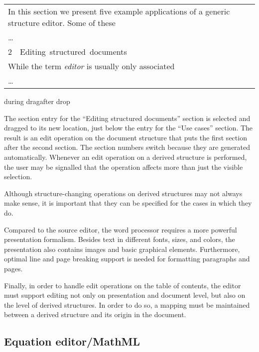 {\begin{tabular}[t]{p{5.2cm}}
\vspace{0.001cm}
In this section we present five example applications of a generic structure editor. Some of these\\
\dots\\
\vspace{0.005cm}
{\small 2~~Editing~structured~documents}\\
\vspace{0.001cm}
While the term {\em editor} is usually only associated\\ %
\dots 
\end{tabular}
}{during drag}{after drop}

The section entry for the ``Editing structured documents'' section is selected and dragged to its new location, just below the entry for the ``Use cases'' section. The result is an edit operation on the document structure that puts the first section after the second section. The section numbers switch because they are generated automatically. Whenever an edit operation on a derived structure is performed, the user may be signalled that the operation affects more than just the visible selection.

Although structure-changing operations on derived structures may not always make sense, it is important that they can be specified for the cases in which they do.
 

Compared to the source editor, the word processor requires a more powerful presentation formalism. Besides text in different fonts, sizes, and colors, the presentation also contains images and basic graphical elements. Furthermore, optimal line and page breaking support is needed for formatting paragraphs and pages. 

Finally, in order to handle edit operations on the table of contents, the editor must support editing not only on presentation and document level, but also on the level of derived structures. In order to do so, a mapping must be maintained between a derived structure and its origin in the document.


%																
\subsection{Equation editor/MathML}  

